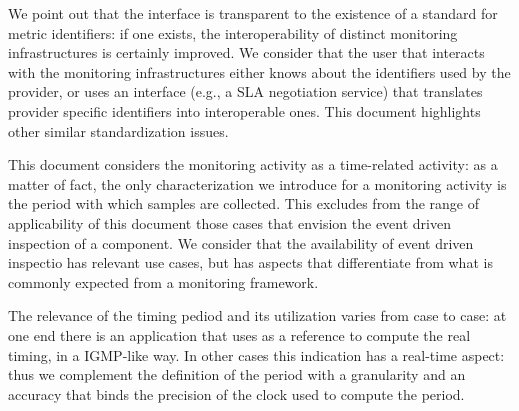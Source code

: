 \documentclass[10pt,a4paper]{article}
\begin{document}


We point out that the interface is transparent to the existence of a standard for metric identifiers: if one exists, the interoperability of distinct monitoring infrastructures is certainly improved. We consider that the user that interacts with the monitoring infrastructures either knows about the identifiers used by the provider, or uses an interface (e.g., a SLA negotiation service) that translates provider specific identifiers into interoperable ones. This document highlights other similar standardization issues.

This document considers the monitoring activity as a time-related activity: as a matter of fact, the only characterization we introduce for a monitoring activity is the period with which samples are collected. This excludes from the range of applicability of this document those cases that envision the event driven inspection of a component. We consider that the availability of event driven inspectio has relevant use cases, but has aspects that differentiate from what is commonly expected from a monitoring framework.

The relevance of the timing pediod and its utilization varies from case to case: at one end there is an application that uses as a reference to compute the real timing, in a IGMP-like way. In other cases this indication has a real-time aspect: thus we complement the definition of the period with a granularity and an accuracy that binds the precision of the clock used to compute the period.
\end{document}
